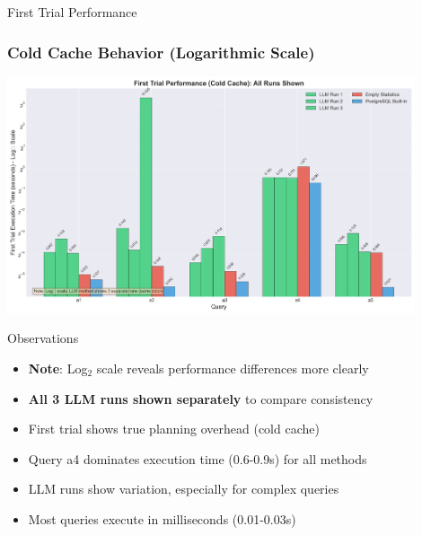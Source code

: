 \documentclass[smaller]{beamer}
\begin{document}
\begin{frame}{First Trial Performance}
\frametitle{Cold Cache Behavior (Logarithmic Scale)}

\begin{center}
\includegraphics[width=0.9\textwidth]{images/first_trial_comparison_fixed.png}
\end{center}

\begin{exampleblock}{Observations}
\begin{itemize}
    \item \textbf{Note}: Log$_2$ scale reveals performance differences more clearly
    \item \textbf{All 3 LLM runs shown separately} to compare consistency
    \item First trial shows true planning overhead (cold cache)
    \item Query a4 dominates execution time (0.6-0.9s) for all methods
    \item LLM runs show variation, especially for complex queries
    \item Most queries execute in milliseconds (0.01-0.03s)
\end{itemize}
\end{exampleblock}


\end{frame}
\end{document}
